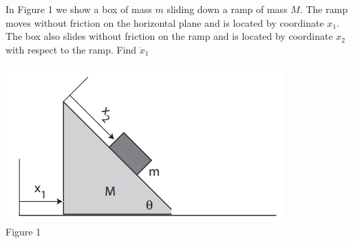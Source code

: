 \documentclass{exam}
\begin{document}
\begin{questions}
        \question In Figure 1 we show a box of mass $m$ sliding down a ramp of mass $M$. The ramp moves
without friction on the horizontal plane and is located by coordinate $x_1$. The box also slides without friction
on the ramp and is located by coordinate $x_2$ with respect to the ramp. Find $\ddot{x}_1$
        \begin{center}
            \includegraphics{../assets/figure1.png}\\
            Figure 1
        \end{center}
        \question
    \end{questions}
\end{document}
